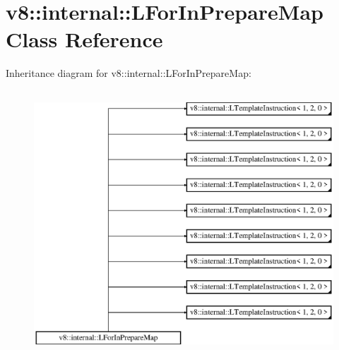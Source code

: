 \hypertarget{classv8_1_1internal_1_1_l_for_in_prepare_map}{}\section{v8\+:\+:internal\+:\+:L\+For\+In\+Prepare\+Map Class Reference}
\label{classv8_1_1internal_1_1_l_for_in_prepare_map}
Inheritance diagram for v8\+:\+:internal\+:\+:L\+For\+In\+Prepare\+Map\+:\begin{figure}[H]
\begin{center}
\leavevmode
\includegraphics[height=10.000000cm]{classv8_1_1internal_1_1_l_for_in_prepare_map}
\end{center}
\end{figure}
